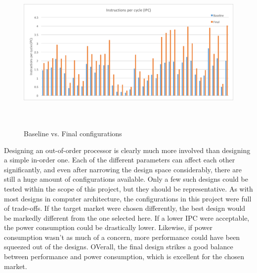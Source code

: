 \documentclass[english]{article}
\begin{document}
\begin{figure}[H]
	\centering
	\includegraphics[height=8cm]{final.png}
	\caption{Baseline vs. Final configurations}
\end{figure}

Designing an out-of-order processor is clearly much more involved than designing a simple in-order one. Each of the different parameters can affect each other significantly, and even after narrowing the design space considerably, there are still a huge amount of configurations available. Only a few such designs could be tested within the scope of this project, but they should be representative. As with most designs in computer architecture, the configurations in this project were full of trade-offs. If the target market were chosen differently, the best design would be markedly different from the one selected here. If a lower IPC were acceptable, the power consumption could be drastically lower. Likewise, if power consumption wasn't as much of a concern, more performance could have been squeezed out of the designs. OVerall, the final design strikes a good balance between performance and power consumption, which is excellent for the chosen market.
\end{document}
